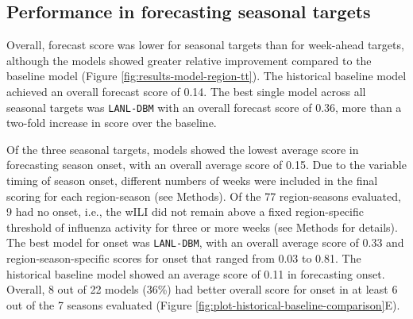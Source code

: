 \documentclass[9pt,twocolumn,twoside]{pnas-new}\usepackage[]{graphicx}\usepackage[]{color}
\begin{document}

\subsection*{Performance in forecasting seasonal targets}




Overall, forecast score was lower for seasonal targets than for week-ahead targets, although the models showed greater relative improvement compared to the baseline model (Figure \ref{fig:results-model-region-tt}).
The historical baseline model achieved  an overall forecast score of 
0.14.
The best single model across all seasonal targets was {\tt LANL-DBM} with an overall forecast score of 
0.36, more than a two-fold increase in score over the baseline.



Of the three seasonal targets, models showed the lowest average score in forecasting season onset, with an overall average score of 
0.15. 
Due to the variable timing of season onset, different numbers of weeks were included in the final scoring for each region-season (see Methods). 
Of the 77 region-seasons evaluated, 9 had no onset, i.e., the wILI did not remain above a fixed region-specific threshold of influenza activity for three or more weeks (see Methods for details). 
The best model for onset was 
{\tt LANL-DBM}, 
with an overall average score of 
0.33
and region-season-specific scores for onset that ranged from
0.03 to 
0.81.
The historical baseline model showed an average score of 
0.11 in forecasting onset.
Overall, 8 out of 22 models (36\%) had better overall score for onset in at least 6 out of the 7 seasons evaluated (Figure \ref{fig:plot-historical-baseline-comparison}E).
\end{document}
